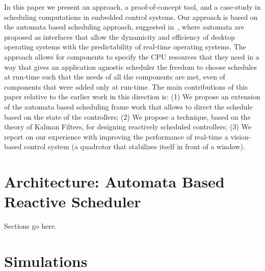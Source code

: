 \documentclass{sig-alternate-ipsn13}
\begin{document}
In this paper we present an approach, a proof-of-concept tool, and a case-study in scheduling computations in embedded control systems. Our approach is based on the automata based scheduling approach, suggested in~\cite{WA07,RTComposer,AW08}, where automata are proposed as interfaces that allow the dynamicity and efficiency of desktop operating systems with the predictability of real-time operating systems. The approach allows for components to specify the CPU resources that they need in a way that gives an application agnostic scheduler the freedom to choose schedules at run-time such that the needs of all the components are met, even of components that were added only at run-time.  The main contributions of this paper relative to the earlier work in this direction is:
(1) We propose an extension of the automata based scheduling frame work that allows to direct the schedule based on the state of the controllers; (2) We propose a technique, based on the theory of Kalman Filters, for designing reactively scheduled controllers; (3) We report on our experience with improving the performance of real-time a vision-based control system (a quadrotor that stabilizes itself in front of a window).

\section{Architecture: Automata Based Reactive Scheduler}

Sections go here.

\section{Simulations}
\label{sec:simulation}
\end{document}
